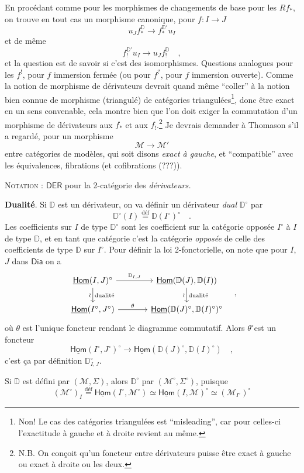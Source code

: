 \documentclass[11pt]{article}
\newcommand{\printedpage}[1]{\marginpar{\footnotesize p.~#1}}
\newcommand{\msp}[1]{\marginpar{\footnotesize [#1]}}
\newcommand{\DD}{\mathbb{D}}
\newcommand{\uHom}{\underline{\mathsf{Hom}}}
\newcommand{\Dia}{\mathsf{Dia}}
\newcommand{\defeq}{\overset{\text{déf}}{=}}
\begin{document}
En procédant comme pour les morphismes de changements de base pour les $Rf_*$, on trouve en tout cas un morphisme canonique, pour $f : I \to J$
\[
u_Jf_*^{\DD} \longrightarrow f_*^{\DD'}u_I
\]
\printedpage{13}%
et de même
\[
f_!^{\DD'}u_I \longrightarrow u_Jf_!^{\DD} \quad ,
\]
et la question est de savoir si c’est des isomorphismes. Questions analogues pour les $f^!$, pour $f$ immersion fermée (ou pour $f^?$, pour $f$ immersion ouverte). Comme la notion de morphisme de dérivateurs devrait quand même “coller” à la notion bien connue de morphisme (triangulé) de catégories triangulées\footnote[8]{Non! Le cas des catégories triangulées est “misleading”, car pour celles-ci l’exactitude à gauche et à droite revient au même.}, donc être exact en un sens convenable, cela montre bien que l’on doit exiger la commutation d’un morphisme de dérivateurs aux $f_*$ et aux $f_!$.\footnote[9]{N.B. On conçoit qu’un foncteur entre dérivateurs puisse être exact à gauche ou exact à droite ou les deux.} Je devrais demander à Thomason s’il a regardé, pour un morphisme
\[
\mathcal{M} \longrightarrow \mathcal{M}'
\]
entre catégories de modèles, qui soit disons \textit{exact à gauche}, et “compatible” avec les équivalences, fibrations (et cofibrations (???)).

\noindent\textsc{Notation} : $\mathsf{DER}$ pour la 2-catégorie des \textit{dérivateurs.}

\noindent\msp{page 17}\textbf{Dualité}. Si $\DD$ est un dérivateur, on va définir un dérivateur \textit{dual} $\DD^\circ$ par
\[
\DD^\circ(I) \defeq \DD(I^\circ)^\circ \quad .
\]
Les coefficients sur $I$ de type $\DD^\circ$ sont les coefficient sur la catégorie opposée $I^\circ$ à $I$ de type $\DD$, et en tant que catégorie c’est la catégorie \textit{opposée} de celle des coefficients de type $\DD$ sur $I^\circ$. Pour définir la loi 2-fonctorielle, on note que pour $I$, $J$ dans $\Dia$ on a %
\[
\begin{tikzcd}[column sep=large]
\uHom(I,J)^\circ \arrow[r, "\DD_{I,J}"] \arrow[d, "\wr"', "\text{dualité}"] & \uHom(\DD(J),\DD(I)) \arrow[d, "\wr"', "\text{dualité}"] \\
\uHom(I^\circ,J^\circ) \arrow[r, "\theta"] & \uHom(\DD(J)^\circ,\DD(I)^\circ)^\circ
\end{tikzcd}
\quad ,
\]
où $\theta$ est l’unique foncteur rendant le diagramme commutatif. Alors $\theta^\circ$est un foncteur
\[
\uHom(I^\circ,J^\circ)^\circ \longrightarrow \uHom(\DD(J)^\circ,\DD(I)^\circ) \quad ,
\]
c’est ça par définition $\DD^\circ_{I,J}$.

Si $\DD$ est défini par $(\mathcal{M},\Sigma)$, alors $\DD^\circ$ par $(\mathcal{M}^\circ,\Sigma^\circ)$, puisque
\[
(\mathcal{M}^\circ)_I \defeq \uHom(I^\circ,\mathcal{M}^\circ) \simeq \uHom(I,\mathcal{M})^\circ \simeq (\mathcal{M}_{I^\circ})^\circ
\]
\end{document}
